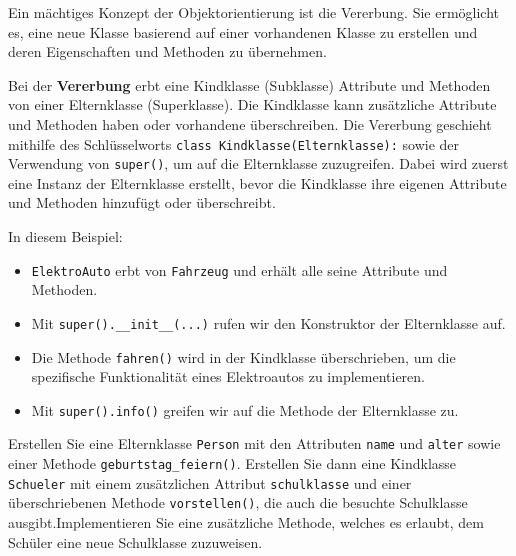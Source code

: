 Ein mächtiges Konzept der Objektorientierung ist die Vererbung. Sie ermöglicht es, eine neue Klasse basierend auf einer vorhandenen Klasse zu erstellen und deren Eigenschaften und Methoden zu übernehmen.

\begin{mydefinition}
Bei der \textbf{Vererbung} erbt eine Kindklasse (Subklasse) Attribute und Methoden von einer Elternklasse (Superklasse). Die Kindklasse kann zusätzliche Attribute und Methoden haben oder vorhandene überschreiben. Die Vererbung geschieht mithilfe des Schlüsselworts \lstinline|class Kindklasse(Elternklasse):| sowie der Verwendung von \lstinline|super()|, um auf die Elternklasse zuzugreifen. Dabei wird zuerst eine Instanz der Elternklasse erstellt, bevor die Kindklasse ihre eigenen Attribute und Methoden hinzufügt oder überschreibt.
\end{mydefinition}

\begin{myexample}[Vererbung]

\end{myexample}

In diesem Beispiel:
\begin{itemize}
	\item \lstinline|ElektroAuto| erbt von \lstinline|Fahrzeug| und erhält alle seine Attribute und Methoden.
	\item Mit \lstinline|super().__init__(...)| rufen wir den Konstruktor der Elternklasse auf.
	\item Die Methode \lstinline|fahren()| wird in der Kindklasse überschrieben, um die spezifische Funktionalität eines Elektroautos zu implementieren.
	\item Mit \lstinline|super().info()| greifen wir auf die Methode der Elternklasse zu.
\end{itemize}

\begin{myexercise}
	Erstellen Sie eine Elternklasse \lstinline|Person| mit den Attributen \lstinline|name| und \lstinline|alter| sowie einer Methode \lstinline|geburtstag_feiern()|. Erstellen Sie dann eine Kindklasse \lstinline|Schueler| mit einem zusätzlichen Attribut \lstinline|schulklasse| und einer überschriebenen Methode \lstinline|vorstellen()|, die auch die besuchte Schulklasse ausgibt.Implementieren Sie eine zusätzliche Methode, welches es erlaubt, dem Schüler eine neue Schulklasse zuzuweisen.
	\begin{myanswer}
		\leavevmode
		
	\end{myanswer}
\end{myexercise}

